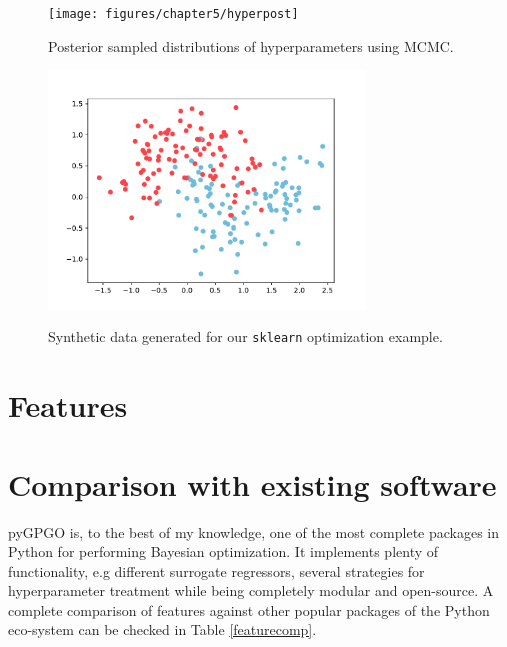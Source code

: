 \documentclass[10pt,a4paper,twoside]{book}
\begin{document}
\begin{figure}
\centering
\caption{Posterior sampled distributions of hyperparameters using MCMC.}
\texttt{[image: figures/chapter5/hyperpost]}
\label{fig:hyperpost}
\end{figure}


\begin{figure}
\centering
\caption{Synthetic data generated for our \texttt{sklearn} optimization example.}
\includegraphics[width=0.75\textwidth]{figures/chapter5/makemoons}
\label{fig:makemoons}
\end{figure}




\section{Features}\label{features}
\section{Comparison with existing software}

pyGPGO is, to the best of my knowledge, one of the most complete packages in Python for performing Bayesian optimization. It implements plenty of functionality, e.g different surrogate regressors, several strategies for hyperparameter treatment while being completely modular and open-source. A complete comparison of features against other popular packages of the Python eco-system can be checked in Table \ref{featurecomp}.

\newpage
\end{document}
